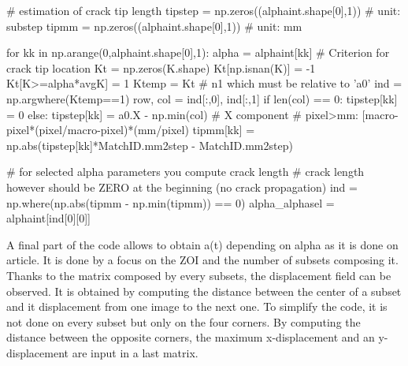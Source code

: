 \begin{customFrame}
# estimation of crack tip length
tipstep = np.zeros((alphaint.shape[0],1)) # unit: substep
tipmm = np.zeros((alphaint.shape[0],1)) # unit: mm

for kk in np.arange(0,alphaint.shape[0],1):
alpha = alphaint[kk]
# Criterion for crack tip location
Kt = np.zeros(K.shape)
Kt[np.isnan(K)] = -1
Kt[K>=alpha*avgK] = 1
Ktemp = Kt
# n1 which must be relative to 'a0'
ind = np.argwhere(Ktemp==1)
row, col = ind[:,0], ind[:,1]
if len(col) == 0:
tipstep[kk] = 0
else:
tipstep[kk] = a0.X - np.min(col) # X component
# pixel>mm: [macro-pixel*(pixel/macro-pixel)*(mm/pixel)
tipmm[kk] = np.abs(tipstep[kk]*MatchID.mm2step - MatchID.mm2step)

# for selected  alpha parameters you compute crack length
# crack length however should be ZERO at the beginning (no crack propagation)
ind = np.where(np.abs(tipmm - np.min(tipmm)) == 0)
alpha_alphasel = alphaint[ind[0][0]]
\end{customFrame}
A final part of the code allows to obtain a(t) depending on alpha  as it is done on \parencite{Reference14} article. It is done by a focus on the ZOI and the number of subsets composing it. Thanks to the matrix composed by every subsets, the displacement field can be observed. It is obtained by computing the distance between the center of a subset and it displacement from one image to the next one. To simplify the code, it is not done on every subset but only on the four corners. By computing the distance between the opposite corners, the maximum x-displacement and an y-displacement are input in a last matrix.
